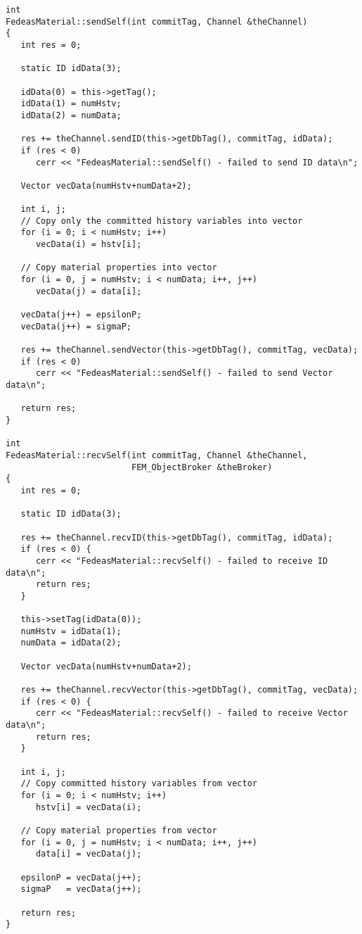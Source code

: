\documentclass[12pt]{article}
\begin{document}
{\sf\small
\begin{verbatim}
int 
FedeasMaterial::sendSelf(int commitTag, Channel &theChannel)
{
   int res = 0;
     
   static ID idData(3);
     
   idData(0) = this->getTag();
   idData(1) = numHstv;
   idData(2) = numData;
     
   res += theChannel.sendID(this->getDbTag(), commitTag, idData);
   if (res < 0) 
      cerr << "FedeasMaterial::sendSelf() - failed to send ID data\n";
     
   Vector vecData(numHstv+numData+2);
     
   int i, j;
   // Copy only the committed history variables into vector
   for (i = 0; i < numHstv; i++)
      vecData(i) = hstv[i];
     
   // Copy material properties into vector
   for (i = 0, j = numHstv; i < numData; i++, j++)
      vecData(j) = data[i];
     
   vecData(j++) = epsilonP;
   vecData(j++) = sigmaP;
     
   res += theChannel.sendVector(this->getDbTag(), commitTag, vecData);
   if (res < 0) 
      cerr << "FedeasMaterial::sendSelf() - failed to send Vector data\n";
     
   return res;
}

int
FedeasMaterial::recvSelf(int commitTag, Channel &theChannel,
                         FEM_ObjectBroker &theBroker)
{
   int res = 0;
     
   static ID idData(3);
     
   res += theChannel.recvID(this->getDbTag(), commitTag, idData);
   if (res < 0) {
      cerr << "FedeasMaterial::recvSelf() - failed to receive ID data\n";
      return res;
   }
     
   this->setTag(idData(0));
   numHstv = idData(1);
   numData = idData(2);
     
   Vector vecData(numHstv+numData+2);
     
   res += theChannel.recvVector(this->getDbTag(), commitTag, vecData);
   if (res < 0) {
      cerr << "FedeasMaterial::recvSelf() - failed to receive Vector data\n";
      return res;
   }
     
   int i, j;
   // Copy committed history variables from vector
   for (i = 0; i < numHstv; i++)
      hstv[i] = vecData(i);
     
   // Copy material properties from vector
   for (i = 0, j = numHstv; i < numData; i++, j++)
      data[i] = vecData(j);
     
   epsilonP = vecData(j++);
   sigmaP   = vecData(j++);
     
   return res;
}
\end{verbatim}
}
\end{document}
